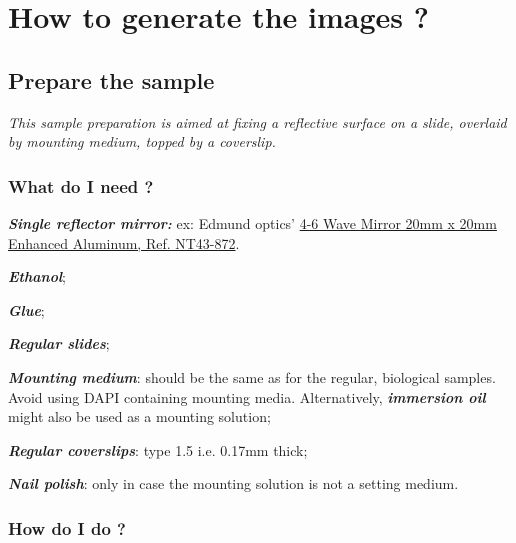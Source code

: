 \documentclass[a4paper, 11pt]{report}%
\begin{document}
\section{How to generate the images ?}
\label{sec:garr-what}

\subsection{Prepare the sample}
\label{sec:garr-proto}

\textit{This sample preparation is aimed at fixing a reflective surface on a slide, overlaid by mounting medium, topped by a coverslip.}

\subsubsection{What do I need ?}
\label{sec:garr-proto-what}

\begin{itemize*}
	\item \textbf{\textit{Single reflector mirror:}} ex: Edmund optics' \href{http://www.edmundoptics.com/onlinecatalog/displayproduct.cfm?productid=1754&showall}{4-6 Wave Mirror 20mm x 20mm Enhanced Aluminum, Ref. NT43-872}.
	\item \textbf{\textit{Ethanol}};
	\item \textbf{\textit{Glue}};
	\item \textbf{\textit{Regular slides}};
	\item \textbf{\textit{Mounting medium}}: should be the same as for the regular, biological samples. Avoid using DAPI containing mounting media. Alternatively, \textbf{\textit{immersion oil}} might also be used as a mounting solution;
	\item \textbf{\textit{Regular coverslips}}: type 1.5 i.e. 0.17mm thick;
	\item \textbf{\textit{Nail polish}}: only in case the mounting solution is not a setting medium.
\end{itemize*}


\subsubsection{How do I do ?}
\label{sec:garr-proto-how}
\end{document}
